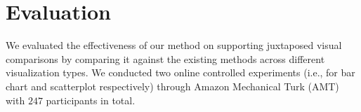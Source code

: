 \section {Evaluation}
\label{sec:results}

We evaluated the effectiveness of our method on supporting juxtaposed visual comparisons by comparing it against the existing methods across different visualization types.
We conducted two online controlled experiments (i.e., for bar chart and scatterplot respectively) through Amazon Mechanical Turk (AMT) with $247$ participants in total.

